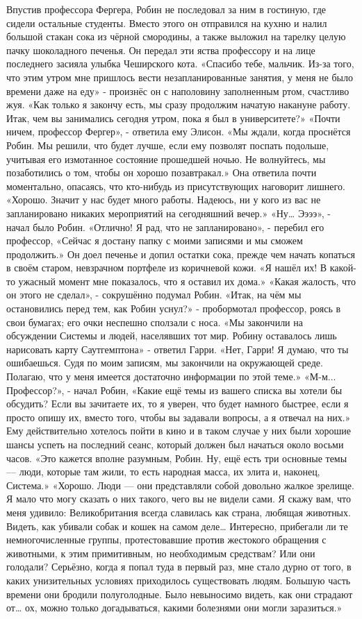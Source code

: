 \documentclass[a4paper,12pt]{book}
\begin{document}
	Впустив профессора Фергера, Робин не последовал за ним в гостиную, где сидели остальные студенты. Вместо этого он отправился на кухню и налил большой стакан сока из чёрной смородины, а также выложил на тарелку целую пачку шоколадного печенья.
	Он передал эти яства профессору и на лице последнего засияла улыбка Чеширского кота.
	«Спасибо тебе, мальчик. Из-за того, что этим утром мне пришлось вести незапланированные занятия, у меня не было времени даже на еду» - произнёс он с наполовину заполненным ртом, счастливо жуя.
	«Как только я закончу есть, мы сразу продолжим начатую накануне работу. Итак, чем вы занимались сегодня утром, пока я был в университете?»
	«Почти ничем, профессор Фергер», - ответила ему Элисон.
	«Мы ждали, когда проснётся Робин. Мы решили, что будет лучше, если ему позволят поспать подольше, учитывая его измотанное состояние прошедшей ночью. Не волнуйтесь, мы позаботились о том, чтобы он хорошо позавтракал.»
	Она ответила почти моментально, опасаясь, что кто-нибудь из присутствующих наговорит лишнего.
	«Хорошо. Значит у нас будет много работы. Надеюсь, ни у кого из вас не запланировано никаких мероприятий на сегодняшний вечер.» 
	«Ну… Ээээ», - начал было Робин.
	«Отлично! Я рад, что не запланировано», - перебил его профессор,
	«Сейчас я достану папку с моими записями и мы сможем продолжить.»
	Он доел печенье и допил остатки сока, прежде чем начать копаться в своём старом, невзрачном портфеле из коричневой кожи.
	«Я нашёл их! В какой-то ужасный момент мне показалось, что я оставил их дома.»
	«Какая жалость, что он этого не сделал», - сокрушённо подумал Робин.
	«Итак, на чём мы остановились перед тем, как Робин уснул?» - пробормотал профессор, роясь в свои бумагах; его очки неспешно сползали с носа.
	«Мы закончили на обсуждении Системы и людей, населявших тот мир. Робину оставалось лишь нарисовать карту Саутгемптона» - ответил Гарри.
	«Нет, Гарри! Я думаю, что ты ошибаешься. Судя по моим записям, мы закончили на окружающей среде. Полагаю, что у меня имеется достаточно информации по этой теме.»
	«М-м... Профессор?», - начал Робин,
	«Какие ещё темы из вашего списка вы хотели бы обсудить? Если вы зачитаете их, то я уверен, что будет намного быстрее, если я просто опишу их, вместо того, чтобы вы задавали вопросы, а я отвечал на них.»
	Ему действительно хотелось пойти в кино и в таком случае у них были хорошие шансы успеть на последний сеанс, который должен был начаться около восьми часов.
	«Это кажется вполне разумным, Робин. Ну, ещё есть три основные темы — люди, которые там жили, то есть народная масса, их элита и, наконец, Система.»
	«Хорошо. Люди — они представляли собой довольно жалкое зрелище. Я мало что могу сказать о них такого, чего вы не видели сами. Я скажу вам, что меня удивило: Великобритания всегда славилась как страна, любящая животных. Видеть, как убивали собак и кошек на самом деле… Интересно, прибегали ли те немногочисленные группы, протестовавшие против жестокого обращения с животными, к этим примитивным, но необходимым средствам? Или они голодали? Серьёзно, когда я попал туда в первый раз, мне стало дурно от того, в каких унизительных условиях приходилось существовать людям. Большую часть времени они бродили полуголодные. Было невыносимо видеть, как они страдают от… ох, можно только догадываться, какими болезнями они могли заразиться.»
\end{document}
